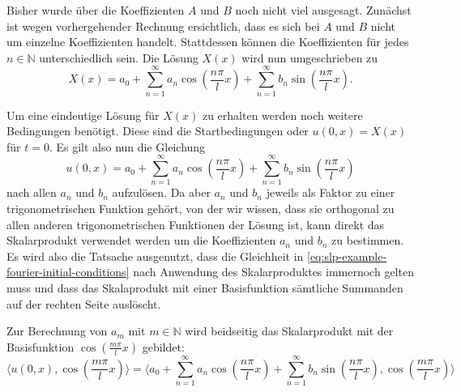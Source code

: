 Bisher wurde über die Koeffizienten $A$ und $B$ noch nicht viel ausgesagt.
Zunächst ist wegen vorhergehender Rechnung ersichtlich, dass es sich bei
$A$ und $B$ nicht um einzelne Koeffizienten handelt.
Stattdessen können die Koeffizienten für jedes $n \in \mathbb{N}$
unterschiedlich sein.
Die Lösung $X(x)$ wird nun umgeschrieben zu
\[
    X(x)
    =
    a_0
    +
    \sum_{n = 1}^{\infty} a_n\cos\left(\frac{n\pi}{l}x\right)
    +
    \sum_{n = 1}^{\infty} b_n\sin\left(\frac{n\pi}{l}x\right).
\]

Um eine eindeutige Lösung für $ X(x) $ zu erhalten werden noch weitere
Bedingungen benötigt.
Diese sind die Startbedingungen oder $u(0, x) = X(x)$ für $t = 0$.
Es gilt also nun die Gleichung
\begin{equation}
    \label{eq:slp-example-fourier-initial-conditions}
    u(0, x)
    =
    a_0
    +
    \sum_{n = 1}^{\infty} a_n\cos\left(\frac{n\pi}{l}x\right)
    +
    \sum_{n = 1}^{\infty} b_n\sin\left(\frac{n\pi}{l}x\right)
\end{equation}
nach allen $a_n$ und $b_n$ aufzulösen.
Da aber $a_n$ und $b_n$ jeweils als Faktor zu einer trigonometrischen Funktion
gehört, von der wir wissen, dass sie orthogonal zu allen anderen
trigonometrischen Funktionen der Lösung ist, kann direkt das Skalarprodukt
verwendet werden um die Koeffizienten $a_n$ und $b_n$ zu bestimmen.
Es wird also die Tatsache ausgenutzt, dass die Gleichheit in
\eqref{eq:slp-example-fourier-initial-conditions} nach Anwendung des
Skalarproduktes immernoch gelten muss und dass das Skalaprodukt mit einer
Basisfunktion sämtliche Summanden auf der rechten Seite auslöscht.

Zur Berechnung von $a_m$ mit $ m \in \mathbb{N} $ wird beidseitig das
Skalarprodukt mit der Basisfunktion $ \cos\left(\frac{m \pi}{l}x\right)$
gebildet:
\begin{equation}
    \label{eq:slp-dot-product-cosine}
    \langle u(0, x), \cos\left(\frac{m \pi}{l}x\right) \rangle
    =
    \langle a_0
    +
    \sum_{n = 1}^{\infty} a_n\cos\left(\frac{n\pi}{l}x\right)
    +
    \sum_{n = 1}^{\infty} b_n\sin\left(\frac{n\pi}{l}x\right),
    \cos\left(\frac{m \pi}{l}x\right)\rangle
\end{equation}

